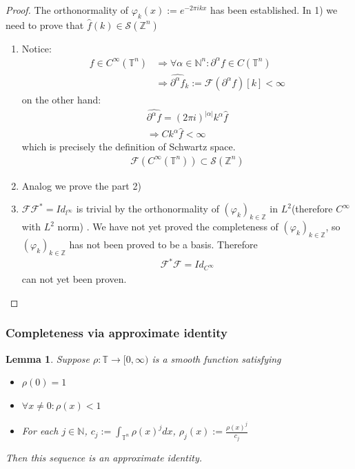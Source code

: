 \documentclass[a4paper,11pt,fleqn]{book}
\newtheorem{lemma}[theorem]{Lemma}
\theoremstyle{definition}
\theoremstyle{remark}
\begin{document}
\begin{proof}
	The orthonormality of $\varphi_k(x):= e^{-2\pi i k x}$ has been established. In 1) we need to prove that $\hat{f}(k) \in \mathcal{S}(\mathbb{Z}^n)$\par 
	\begin{enumerate}
		\item Notice:
		\begin{align*}
			f \in C^\infty(\mathbb{T}^n) &\Rightarrow \forall \alpha \in \mathbb{N}^n:  \partial^\alpha f \in C(\mathbb{T}^n)\\
			&\Rightarrow \widehat{\partial^\alpha f}_k:=  \mathcal{F} (\partial^\alpha f)[k]  < \infty
		\end{align*}
		on the other hand:
		\begin{align*}
			\widehat{\partial^\alpha f} = (2 \pi i )^{|\alpha|} k^\alpha \hat{f}\\
			\Rightarrow C k^\alpha \hat{f} < \infty
		\end{align*}
		which is precisely the definition of Schwartz space.
		\begin{align*}
			\mathcal{F}(C^\infty(\mathbb{T}^n))\subset \mathcal{S}(\mathbb{Z}^n)
		\end{align*}
		\item
		Analog we prove the part 2)
		\item $\mathcal{F} \mathcal{F}^* = Id_{l^\infty}$ is trivial by the orthonormality of $(\varphi_k)_{k \in \mathbb{Z}}$ in $L^2$(therefore $C^\infty$ with $L^2$ norm) . We have not yet proved the completeness of $(\varphi_k)_{k \in \mathbb{Z}}$, so $(\varphi_k)_{k \in \mathbb{Z}}$ has not been proved to be a basis. Therefore 
		\begin{align*}
			\mathcal{F}^* \mathcal{F} = Id_{C^\infty}
		\end{align*}
		can not yet been proven.
	\end{enumerate}
\end{proof}

\subsubsection{Completeness via approximate identity}
\begin{lemma}
	Suppose $\rho: \mathbb{T} \rightarrow [0, \infty)$ is a smooth function satisfying
	\begin{itemize}
		\item $\rho(0) = 1$
		\item $\forall x \neq 0: \rho(x) < 1$
		\item For each $j \in \mathbb{N}$, $c_j := \int_{\mathbb{T}^n} \rho(x)^j dx$, $\rho_j(x):= \frac{\rho(x)^j}{c_j}$ 
	\end{itemize}
	Then this sequence is an approximate identity.
\end{lemma}
\end{document}
